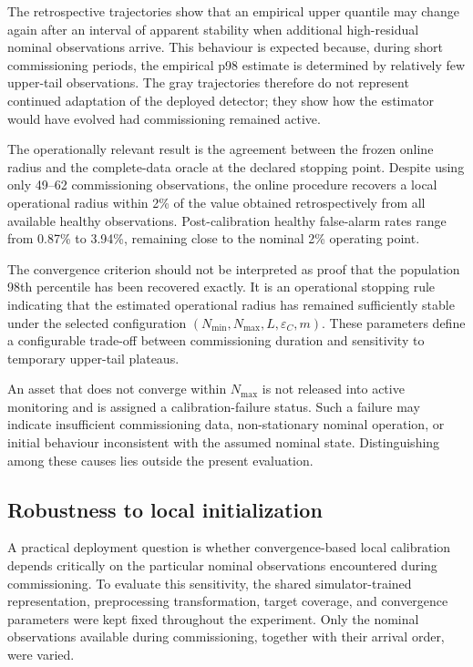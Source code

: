 \documentclass[numbered]{trbunofficial}
\begin{document}
The retrospective trajectories show that an empirical upper quantile may
change again after an interval of apparent stability when additional
high-residual nominal observations arrive. This behaviour is expected
because, during short commissioning periods, the empirical p98 estimate is
determined by relatively few upper-tail observations. The gray trajectories
therefore do not represent continued adaptation of the deployed detector;
they show how the estimator would have evolved had commissioning remained
active.

The operationally relevant result is the agreement between the frozen online
radius and the complete-data oracle at the declared stopping point. Despite
using only 49--62 commissioning observations, the online procedure recovers
a local operational radius within 2\% of the value obtained retrospectively
from all available healthy observations. Post-calibration healthy
false-alarm rates range from 0.87\% to 3.94\%, remaining close to the
nominal 2\% operating point.

The convergence criterion should not be interpreted as proof that the
population 98th percentile has been recovered exactly. 
It is an operational stopping rule indicating that the estimated
operational radius has remained sufficiently stable under the selected
configuration
$(N_{\min},N_{\max},L,\varepsilon_C,m)$. These parameters define a
configurable trade-off between commissioning duration and sensitivity to
temporary upper-tail plateaus.

An asset that does not converge within $N_{\max}$ is not released into
active monitoring and is assigned a calibration-failure status. Such a
failure may indicate insufficient commissioning data, non-stationary nominal
operation, or initial behaviour inconsistent with the assumed nominal state.
Distinguishing among these causes lies outside the present evaluation.

\subsection{Robustness to local initialization}
\label{sec:initialization-robustness}

A practical deployment question is whether convergence-based local
calibration depends critically on the particular nominal observations
encountered during commissioning. To evaluate this sensitivity, the shared
simulator-trained representation, preprocessing transformation, target
coverage, and convergence parameters were kept fixed throughout the
experiment. Only the nominal observations available during commissioning,
together with their arrival order, were varied.
\end{document}
